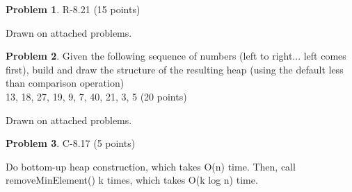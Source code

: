 \documentclass[12pt]{report}
\theoremstyle{definition}
\newtheorem{problem}{Problem}
\begin{document}
\begin{problem} 	R-8.21 (15 points) 		
\end{problem}
				Drawn on attached problems. 

\begin{problem} 	Given the following sequence of numbers (left to right... left comes first), build and draw the 				structure of the resulting heap (using the default less than comparison operation) \\
				13, 18, 27, 19, 9, 7, 40, 21, 3, 5 (20 points) 		
\end{problem}
				Drawn on attached problems.

\begin{problem} 	C-8.17 (5 points) 		
\end{problem}
				Do bottom-up heap construction, which takes O(n) time. Then, call removeMinElement() k 				times, which takes O(k log n) time.
\goodbreak
\end{document}
